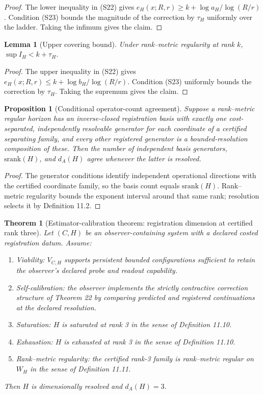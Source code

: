\documentclass[11pt]{article}
\newtheorem{theorem}{Theorem}
\newtheorem{proposition}{Proposition}
\newtheorem{lemma}{Lemma}
\theoremstyle{definition}
\begin{document}
\begin{proof}
The lower inequality in (S22) gives $e_H(x; R, r) \geq k + \log a_H / \log(R/r)$. Condition (S23) bounds the magnitude of the correction by $\tau_H$ uniformly over the ladder. Taking the infimum gives the claim.
\end{proof}

\begin{lemma}[Upper covering bound]
Under rank--metric regularity at rank $k$, $\sup I_H < k + \tau_H$.
\end{lemma}

\begin{proof}
The upper inequality in (S22) gives $e_H(x; R, r) \leq k + \log b_H / \log(R/r)$. Condition (S23) uniformly bounds the correction by $\tau_H$. Taking the supremum gives the claim.
\end{proof}

\begin{proposition}[Conditional operator-count agreement]
Suppose a rank--metric regular horizon has an inverse-closed registration basis with exactly one cost-separated, independently resolvable generator for each coordinate of a certified separating family, and every other registered generator is a bounded-resolution composition of these. Then the number of independent basis generators, $\mathrm{srank}(H)$, and $d_A(H)$ agree whenever the latter is resolved.
\end{proposition}

\begin{proof}
The generator conditions identify independent operational directions with the certified coordinate family, so the basis count equals $\mathrm{srank}(H)$. Rank--metric regularity bounds the exponent interval around that same rank; resolution selects it by Definition 11.2.
\end{proof}

\begin{theorem}[Estimator-calibration theorem: registration dimension at certified rank three]
Let $(C, H)$ be an observer-containing system with a declared costed registration datum. Assume:
\begin{enumerate}[label=(S\arabic*)]
\item[(S1)] Viability: $V_{C,H}$ supports persistent bounded configurations sufficient to retain the observer's declared probe and readout capability.
\item[(S2)] Self-calibration: the observer implements the strictly contractive correction structure of Theorem 22 by comparing predicted and registered continuations at the declared resolution.
\item[(S3)] Saturation: $H$ is saturated at rank 3 in the sense of Definition 11.10.
\item[(S4)] Exhaustion: $H$ is exhausted at rank 3 in the sense of Definition 11.10.
\item[(S5)] Rank--metric regularity: the certified rank-3 family is rank--metric regular on $W_H$ in the sense of Definition 11.11.
\end{enumerate}
Then $H$ is dimensionally resolved and $d_A(H) = 3$.
\end{theorem}
\end{document}

